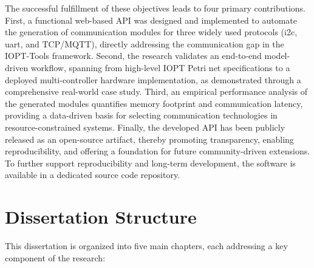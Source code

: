 The successful fulfillment of these objectives leads to four primary contributions. First, a functional web-based API was designed and implemented to automate the generation of communication modules for three widely used protocols (\gls{i2c}, \gls{uart}, and TCP/MQTT), directly addressing the communication gap in the IOPT-Tools framework. Second, the research validates an end-to-end model-driven workflow, spanning from high-level IOPT Petri net specifications to a deployed multi-controller hardware implementation, as demonstrated through a comprehensive real-world case study. Third, an empirical performance analysis of the generated modules quantifies memory footprint and communication latency, providing a data-driven basis for selecting communication technologies in resource-constrained systems. Finally, the developed API has been publicly released as an open-source artifact, thereby promoting transparency, enabling reproducibility, and offering a foundation for future community-driven extensions. To further support reproducibility and long-term development, the software is available in a dedicated source code repository.


\section{Dissertation Structure}
\label{sec:dissertation_structure}


This dissertation is organized into five main chapters, each addressing a key component of the research:


